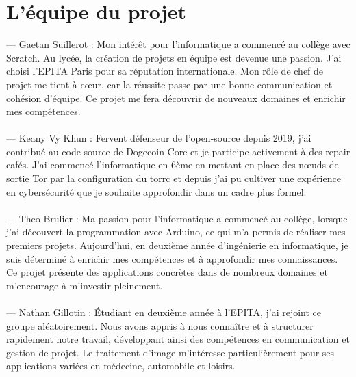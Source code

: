 
%

\chapter{L'équipe du projet}

— Gaetan Suillerot : Mon intérêt pour l'informatique a commencé au collège avec Scratch. Au lycée, la création de projets en équipe est devenue une passion. J'ai choisi l'EPITA Paris pour sa réputation internationale. Mon rôle de chef de projet me tient à cœur, car la réussite passe par une bonne communication et cohésion d'équipe. Ce projet me fera découvrir de nouveaux domaines et enrichir mes compétences. \\\\
— Keany Vy Khun : Fervent défenseur de l'open-source depuis 2019, j'ai contribué au code source de Dogecoin Core et je participe activement à des repair cafés. J'ai commencé l'informatique en 6ème en mettant en place des nœuds de sortie Tor par la configuration du torrc et depuis j'ai pu cultiver une expérience en cybersécurité que je souhaite approfondir dans un cadre plus formel. \\\\
— Theo Brulier :  Ma passion pour l’informatique a commencé au collège, lorsque j'ai découvert la programmation avec Arduino, ce qui m'a permis de réaliser mes premiers projets. Aujourd'hui, en deuxième année d’ingénierie en informatique, je suis déterminé à enrichir mes compétences et à approfondir mes connaissances. Ce projet présente des applications concrètes dans de nombreux domaines et m’encourage à m’investir pleinement.\\\\
— Nathan Gillotin : Étudiant en deuxième année à l'EPITA, j'ai rejoint ce groupe aléatoirement. Nous avons appris à nous connaître et à structurer rapidement notre travail, développant ainsi des compétences en communication et gestion de projet. Le traitement d'image m'intéresse particulièrement pour ses applications variées en médecine, automobile et loisirs.


